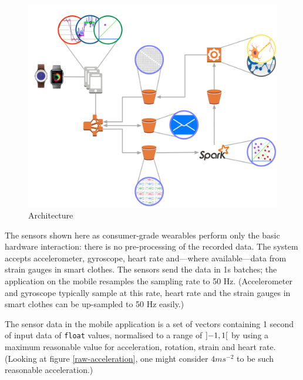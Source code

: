 \documentclass[a4paper, 10 pt, conference]{IEEEtran}
\begin{document}
\begin{figure}[hb]
	\begin{center}
		\includegraphics[scale=0.2]{ri-arch.png}
		\caption{Architecture}
		\label{default}
	\end{center}
\end{figure}

The sensors shown here as consumer-grade wearables perform only the basic hardware interaction: there is no pre-processing of the recorded data. The system accepts accelerometer, gyroscope, heart rate and---where available---data from strain gauges in smart clothes. The sensors send the data in 1s batches; the application on the mobile resamples the sampling rate to 50 Hz. (Accelerometer and gyroscope typically sample at this rate, heart rate and the strain gauges in smart clothes can be up-sampled to 50 Hz easily.) 

The sensor data in the mobile application is a set of vectors containing 1 second of input data of \texttt{float} values, normalised to a range of $\interval[open]{-1}{1}$ by using a maximum reasonable value for acceleration, rotation, strain and heart rate. (Looking at figure \ref{raw-acceleration}, one might consider $4 ms^{-2}$ to be such reasonable acceleration.)
\end{document}
